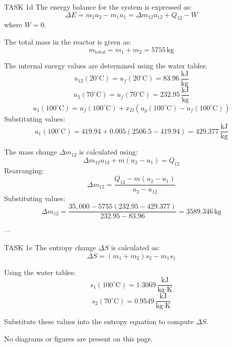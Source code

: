 TASK 1d  
The energy balance for the system is expressed as:  
\[
\Delta E = m_2 u_2 - m_1 u_1 = \Delta m_{12} u_{12} + Q_{12} - W
\]  
where \( W = 0 \).  

The total mass in the reactor is given as:  
\[
m_{\text{total}} = m_1 + m_2 = 5755 \, \text{kg}
\]  

The internal energy values are determined using the water tables:  
\[
u_{12}(20^\circ\text{C}) = u_f(20^\circ\text{C}) = 83.96 \, \frac{\text{kJ}}{\text{kg}}
\]  
\[
u_2(70^\circ\text{C}) = u_f(70^\circ\text{C}) = 232.95 \, \frac{\text{kJ}}{\text{kg}}
\]  
\[
u_1(100^\circ\text{C}) = u_f(100^\circ\text{C}) + x_D (u_g(100^\circ\text{C}) - u_f(100^\circ\text{C}))
\]  
Substituting values:  
\[
u_1(100^\circ\text{C}) = 419.94 + 0.005 (2506.5 - 419.94) = 429.377 \, \frac{\text{kJ}}{\text{kg}}
\]  

The mass change \( \Delta m_{12} \) is calculated using:  
\[
\Delta m_{12} u_{12} + m (u_2 - u_1) = Q_{12}
\]  
Rearranging:  
\[
\Delta m_{12} = \frac{Q_{12} - m (u_2 - u_1)}{u_2 - u_{12}}
\]  
Substituting values:  
\[
\Delta m_{12} = \frac{35,000 - 5755 (232.95 - 429.377)}{232.95 - 83.96} = 3589.346 \, \text{kg}
\]  

---

TASK 1e  
The entropy change \( \Delta S \) is calculated as:  
\[
\Delta S = (m_1 + m_2) s_2 - m_1 s_1
\]  

Using the water tables:  
\[
s_1(100^\circ\text{C}) = 1.3069 \, \frac{\text{kJ}}{\text{kg·K}}
\]  
\[
s_2(70^\circ\text{C}) = 0.9549 \, \frac{\text{kJ}}{\text{kg·K}}
\]  

Substitute these values into the entropy equation to compute \( \Delta S \).  

No diagrams or figures are present on this page.